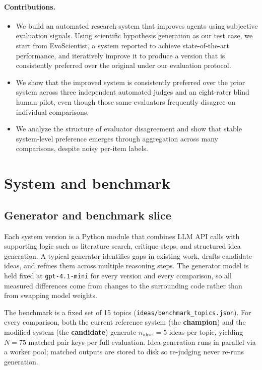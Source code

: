 \documentclass{article}
\begin{document}
\paragraph{Contributions.}
\begin{itemize}

\item We build an automated research system that improves agents using subjective evaluation signals. Using scientific hypothesis generation as our test case, we start from EvoScientist, a system reported to achieve state-of-the-art performance, and iteratively improve it to produce a version that is consistently preferred over the original under our evaluation protocol.

\item We show that the improved system is consistently preferred over the prior system across three independent automated judges and an eight-rater blind human pilot, even though those same evaluators frequently disagree on individual comparisons.

\item We analyze the structure of evaluator disagreement and show that stable system-level preference emerges through aggregation across many comparisons, despite noisy per-item labels.

\end{itemize}

\section{System and benchmark}

\subsection{Generator and benchmark slice}
\label{sec:setup}

Each system version is a Python module that combines LLM API calls with supporting logic such as literature search, critique steps, and structured idea generation. A typical generator identifies gaps in existing work, drafts candidate ideas, and refines them across multiple reasoning steps. The generator model is held fixed at \texttt{gpt-4.1-mini} for every version and every comparison, so all measured differences come from changes to the surrounding code rather than from swapping model weights.

The benchmark is a fixed set of 15 topics (\texttt{ideas/benchmark\_topics.json}). For every comparison, both the current reference system (the \textbf{champion}) and the modified system (the \textbf{candidate}) generate $n_{\text{ideas}}{=}5$ ideas per topic, yielding $N{=}75$ matched pair keys per full evaluation. Idea generation runs in parallel via a worker pool; matched outputs are stored to disk so re-judging never re-runs generation.
\end{document}
